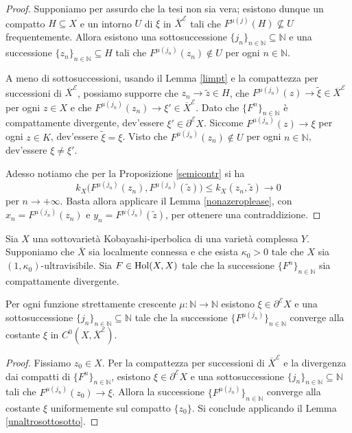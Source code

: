 \begin{proof}
    Supponiamo per assurdo che la tesi non sia vera; esistono dunque un compatto $H\subseteq X$ e un intorno $U$ di $\xi$ in $\overline{X}^\mathcal{E}$ tali che ${F^{\mu(j)}(H)\not\subseteq U}$ frequentemente. Allora esistono una sottosuccessione $\{j_n\}_{n\in\mathbb{N}}\subseteq\mathbb{N}$ e una successione $\{z_n\}_{n\in\mathbb{N}}\subseteq H$ tali che $F^{\mu(j_n)}(z_n)\not\in U$ per ogni $n\in\mathbb{N}$.
    
    A meno di sottosuccessioni, usando il Lemma \ref{limpt} e la compattezza per successioni di $\overline{X}^\mathcal{E}$, possiamo supporre che $z_n\longrightarrow\tilde{z}\in H$, che ${F^{\mu(j_n)}(z)\longrightarrow\tilde{\xi}\in\overline{X}^\mathcal{E}}$ per ogni $z\in X$ e che $F^{\mu(j_n)}(z_n)\longrightarrow\xi'\in\overline{X}^\mathcal{E}$. Dato che $\{F^n\}_{n\in\mathbb{N}}$ è compattamente divergente, dev'essere $\xi'\in\partial^\mathcal{E}X$. Siccome $F^{\mu(j_n)}(z)\longrightarrow\xi$ per ogni $z\in K$, dev'essere $\tilde{\xi}=\xi$. Visto che $F^{\mu(j_n)}(z_n)\not\in U$ per ogni $n\in\mathbb{N}$, dev'essere $\xi\not=\xi'$.

    Adesso notiamo che per la Proposizione \ref{semicontr} si ha
    $$k_X\big(F^{\mu(j_n)}(z_n),F^{\mu(j_n)}(\tilde{z})\big)\le k_X(z_n,\tilde{z})\longrightarrow0$$
    per $n\longrightarrow+\infty$. Basta allora applicare il Lemma \ref{nonazeroplease}, con $x_n=F^{\mu(j_n)}(z_n)$ e $y_n=F^{\mu(j_n)}(\tilde{z})$, per ottenere una contraddizione.
\end{proof}

\begin{lm} \label{estraiunasotto}
    Sia $X$ una sottovarietà Kobayashi-iperbolica di una varietà complessa $Y$. Supponiamo che $\overline{X}$ sia localmente connessa e che esista $\kappa_0>0$ tale che $X$ sia $(1,\kappa_0)$-ultravisibile. Sia $F\in\textnormal{Hol}(X,X)$ tale che la successione $\{F^n\}_{n\in\mathbb{N}}$ sia compattamente divergente.

    Per ogni funzione strettamente crescente $\mu:\mathbb{N}\longrightarrow\mathbb{N}$ esistono $\xi\in\partial^\mathcal{E}X$ e una sottosuccessione $\{j_n\}_{n\in\mathbb{N}}\subseteq\mathbb{N}$ tale che la successione $\{F^{\mu(j_n)}\}_{n\in\mathbb{N}}$ converge alla costante $\xi$ in $C^0(X,\overline{X}^\mathcal{E})$.
\end{lm}

\begin{proof}
    Fissiamo $z_0\in X$. Per la compattezza per successioni di $\overline{X}^\mathcal{E}$ e la divergenza dai compatti di $\{F^n\}_{n\in\mathbb{N}}$, esistono $\xi\in\partial^\mathcal{E}X$ e una sottosuccessione $\{j_n\}_{n\in\mathbb{N}}\subseteq\mathbb{N}$ tali che $F^{\mu(j_n)}(z_0)\longrightarrow\xi$. Allora la successione $\{F^{\mu(j_n)}\}_{n\in\mathbb{N}}$ converge alla costante $\xi$ uniformemente sul compatto $\{z_0\}$. Si conclude applicando il Lemma \ref{unaltrosottosotto}.
\end{proof}

